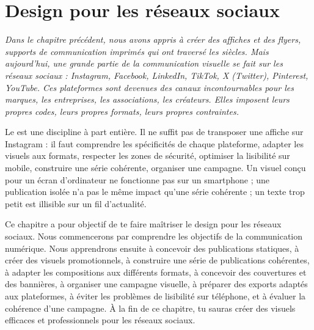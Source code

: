 
\chapter{Design pour les réseaux sociaux}

\noindent
\textit{Dans le chapitre précédent, nous avons appris à créer des affiches et des flyers, supports de communication imprimés qui ont traversé les siècles. Mais aujourd'hui, une grande partie de la communication visuelle se fait sur les \emph{réseaux sociaux} : Instagram, Facebook, LinkedIn, TikTok, X (Twitter), Pinterest, YouTube. Ces plateformes sont devenues des canaux incontournables pour les marques, les entreprises, les associations, les créateurs. Elles imposent leurs propres codes, leurs propres formats, leurs propres contraintes.}

\vspace{1em}

\noindent
Le  est une discipline à part entière. Il ne suffit pas de transposer une affiche sur Instagram : il faut comprendre les spécificités de chaque plateforme, adapter les visuels aux formats, respecter les zones de sécurité, optimiser la lisibilité sur mobile, construire une série cohérente, organiser une campagne. Un visuel conçu pour un écran d'ordinateur ne fonctionne pas sur un smartphone ; une publication isolée n'a pas le même impact qu'une série cohérente ; un texte trop petit est illisible sur un fil d'actualité.

\vspace{1em}

\noindent
Ce chapitre a pour objectif de te faire maîtriser le design pour les réseaux sociaux. Nous commencerons par comprendre les objectifs de la communication numérique. Nous apprendrons ensuite à concevoir des publications statiques, à créer des visuels promotionnels, à construire une série de publications cohérentes, à adapter les compositions aux différents formats, à concevoir des couvertures et des bannières, à organiser une campagne visuelle, à préparer des exports adaptés aux plateformes, à éviter les problèmes de lisibilité sur téléphone, et à évaluer la cohérence d'une campagne. À la fin de ce chapitre, tu sauras créer des visuels efficaces et professionnels pour les réseaux sociaux.

